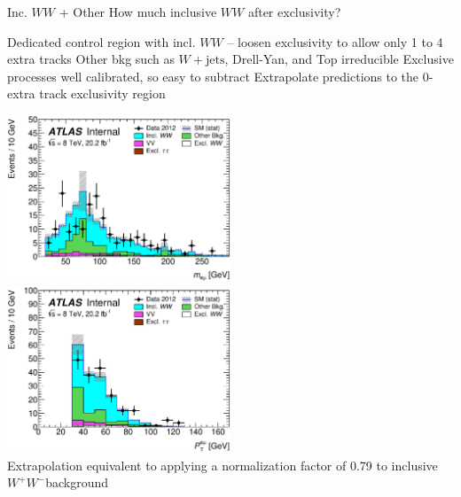 \documentclass[10pt]{beamer}
\newcommand*{\Wjets}{\ensuremath{W+\text{jets}}}
\newcommand*{\WW}{\ensuremath{W^+W^-}} %
\begin{document}
\begin{frame}{Inc. $WW$ + Other}
\centering
{\large\color{blue} How much inclusive $WW$ after exclusivity?}
\begin{outline}
\1 Dedicated control region with incl. $WW$ -- loosen exclusivity to allow only 1 to 4 extra tracks
	\2 Other bkg such as \Wjets, Drell-Yan, and Top irreducible
	\2 Exclusive processes well calibrated, so easy to subtract
\1 Extrapolate predictions to the 0-extra track exclusivity region 
\end{outline}
   \includegraphics[width=0.5\textwidth]{figures/emme-xtraTracks-Mll-lin.eps}
   \includegraphics[width=0.5\textwidth]{figures/emme-xtraTracks-Ptll-lin.eps}\\
\centering
Extrapolation equivalent to applying a normalization factor of 0.79 to inclusive \WW background
\end{frame}
\end{document}
